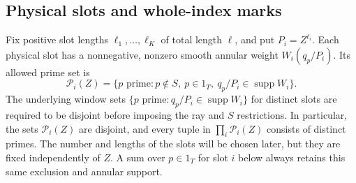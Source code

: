 \documentclass[12pt]{article}
\begin{document}
\subsection{Physical slots and whole-index marks}
Fix positive slot lengths $\ell_1,\ldots,\ell_K$ of total length
$\ell$, and put $P_i=Z^{\ell_i}$.  Each physical slot has a
nonnegative, nonzero smooth annular weight $W_i(q_p/P_i)$.  Its allowed
prime set is
\[
 \mathcal P_i(Z)=\{p\text{ prime}:p\notin S,\ p\in1_T,
                         \ q_p/P_i\in\operatorname{supp}W_i\}.
\]
The underlying window sets
$\{p\text{ prime}:q_p/P_i\in\operatorname{supp}W_i\}$ for distinct slots
are required to be disjoint before imposing the ray and $S$ restrictions.
In particular, the sets $\mathcal P_i(Z)$ are disjoint, and every tuple in
$\prod_i\mathcal P_i(Z)$ consists of distinct primes.
The number and lengths of the slots will be chosen later, but they are
fixed independently of $Z$.  A sum over $p\in1_T$ for slot $i$ below
always retains this same exclusion and annular support.
\end{document}
